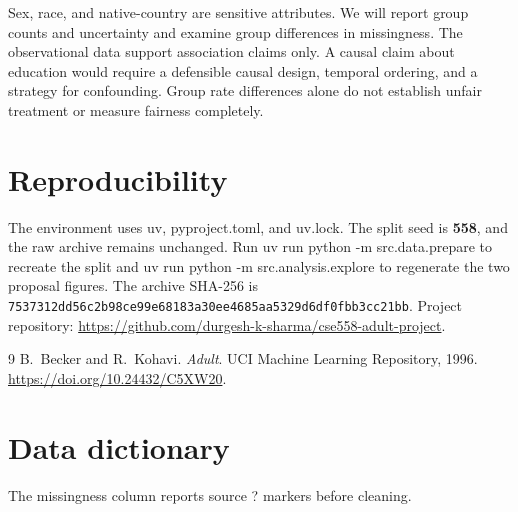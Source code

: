 \documentclass[11pt,a4paper]{article}
\newcommand{\code}[1]{{\small\ttfamily #1}}
\newcommand{\seedvalue}{\textbf{558}}
\begin{document}
Sex, race, and native-country are sensitive attributes. We will report group
counts and uncertainty and examine group differences in missingness. The
observational data support association claims only. A causal claim about
education would require a defensible causal design, temporal ordering, and a
strategy for confounding. Group rate differences alone do not establish
unfair treatment or measure fairness completely.

\section{Reproducibility}

The environment uses \code{uv}, \code{pyproject.toml}, and \code{uv.lock}. The
split seed is \seedvalue, and the raw archive remains unchanged. Run
\code{uv run python -m src.data.prepare} to recreate the split and
\code{uv run python -m src.analysis.explore} to regenerate the two proposal
figures. The archive SHA-256 is
\texttt{7537312d\allowbreak d56c2b98\allowbreak ce99e681\allowbreak 83a30ee4\allowbreak 685aa532\allowbreak 9d6df0fb\allowbreak b3cc21bb}.
Project repository: \url{https://github.com/durgesh-k-sharma/cse558-adult-project}.

\begin{thebibliography}{9}\small
{} B.~Becker and R.~Kohavi. \emph{Adult}. UCI Machine Learning Repository, 1996.
\url{https://doi.org/10.24432/C5XW20}.
\end{thebibliography}

\clearpage
\appendix
\section{Data dictionary}\label{app:dict}

The missingness column reports source \code{?} markers before cleaning.
\end{document}

